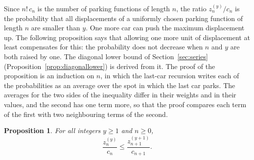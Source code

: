 \documentclass{amsart}
\newtheorem{proposition}[theorem]{Proposition}
\theoremstyle{definition}
\theoremstyle{remark}
\numberwithin{equation}{section}
\begin{document}
Since $n!\,c_n$ is the number of parking functions of length $n$, the ratio $z^{(y)}_n/c_n$ is the probability that all displacements of a uniformly chosen parking function of length $n$ are smaller than $y$. One more car can push the maximum displacement up. The following proposition says that allowing one more unit of displacement at least compensates for this: the probability does not decrease when $n$ and $y$ are both raised by one. The diagonal lower bound of Section~\ref{sec:series} (Proposition~\ref{prop:diagonallower}) is derived from it. The proof of the proposition is an induction on $n$, in which the last-car recursion writes each of the probabilities as an average over the spot in which the last car parks. The averages for the two sides of the inequality differ in their weights and in their values, and the second has one term more, so that the proof compares each term of the first with two neighbouring terms of the second.

\begin{proposition}\label{prop:diagonalmonotone}
For all integers $y\ge 1$ and $n\ge 0$,
\[
\frac{z^{(y)}_n}{c_n}\le\frac{z^{(y+1)}_{n+1}}{c_{n+1}}.
\]
\end{proposition}
\end{document}
